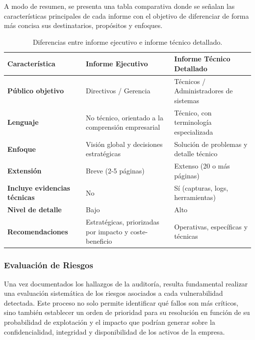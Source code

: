 \documentclass[a4paper, 11pt]{article}
\begin{document}
A modo de resumen, se presenta una tabla comparativa donde se señalan las características principales de cada informe con el objetivo de diferenciar de forma más concisa sus destinatarios, propósitos y enfoques.

\begin{table}[H]
\centering
\begin{tabular}{|p{4cm}|p{5cm}|p{5cm}|}
\hline
\textbf{Característica} & \textbf{Informe Ejecutivo} & \textbf{Informe Técnico Detallado} \\
\hline
\textbf{Público objetivo} & Directivos / Gerencia & Técnicos / Administradores de sistemas \\
\hline
\textbf{Lenguaje} & No técnico, orientado a la comprensión empresarial & Técnico, con terminología especializada \\
\hline
\textbf{Enfoque} & Visión global y decisiones estratégicas & Solución de problemas y detalle técnico \\
\hline
\textbf{Extensión} & Breve (2-5 páginas) & Extenso (20 o más páginas) \\
\hline
\textbf{Incluye evidencias técnicas} & No & Sí (capturas, logs, herramientas) \\
\hline
\textbf{Nivel de detalle} & Bajo & Alto \\
\hline
\textbf{Recomendaciones} & Estratégicas, priorizadas por impacto y coste-beneficio & Operativas, específicas y técnicas \\
\hline
\end{tabular}
\caption{Diferencias entre informe ejecutivo e informe técnico detallado.}
\end{table}






\vspace{0.5cm}

\subsubsection{Evaluación de Riesgos}

Una vez documentados los hallazgos de la auditoría, resulta fundamental realizar una evaluación sistemática de los riesgos asociados a 
cada vulnerabilidad detectada. Este proceso no solo permite identificar qué fallos son más críticos, sino también establecer un orden de 
prioridad para su resolución en función de su probabilidad de explotación y el impacto que podrían generar sobre la confidencialidad, 
integridad y disponibilidad de los activos de la empresa.
\end{document}
